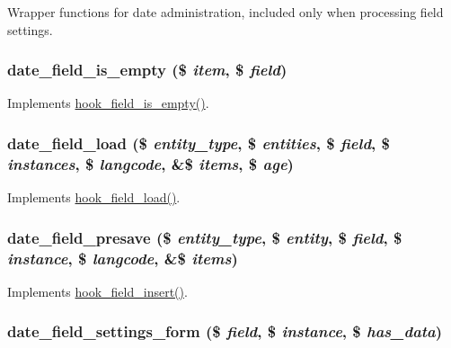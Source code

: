 Wrapper functions for date administration, included only when processing field settings. \hypertarget{date_8field_8inc_aedcb2a64f24594d3c65037e9eb2346e2}{
\subsubsection[{date\_\-field\_\-is\_\-empty}]{\setlength{\rightskip}{0pt plus 5cm}date\_\-field\_\-is\_\-empty (\$ {\em item}, \/  \$ {\em field})}}
\label{date_8field_8inc_aedcb2a64f24594d3c65037e9eb2346e2}
Implements \hyperlink{group__field__types_ga192dd7e7a02a7bc9e0af8b67b187b071}{hook\_\-field\_\-is\_\-empty()}. \hypertarget{date_8field_8inc_a0d7b24400d26db6ee3792d916b76be54}{
\subsubsection[{date\_\-field\_\-load}]{\setlength{\rightskip}{0pt plus 5cm}date\_\-field\_\-load (\$ {\em entity\_\-type}, \/  \$ {\em entities}, \/  \$ {\em field}, \/  \$ {\em instances}, \/  \$ {\em langcode}, \/  \&\$ {\em items}, \/  \$ {\em age})}}
\label{date_8field_8inc_a0d7b24400d26db6ee3792d916b76be54}
Implements \hyperlink{group__field__types_ga37f2456e9b5b8b39dc11cffd59163c19}{hook\_\-field\_\-load()}. \hypertarget{date_8field_8inc_ac5f5698a39e9851297e225104340f307}{
\subsubsection[{date\_\-field\_\-presave}]{\setlength{\rightskip}{0pt plus 5cm}date\_\-field\_\-presave (\$ {\em entity\_\-type}, \/  \$ {\em entity}, \/  \$ {\em field}, \/  \$ {\em instance}, \/  \$ {\em langcode}, \/  \&\$ {\em items})}}
\label{date_8field_8inc_ac5f5698a39e9851297e225104340f307}
Implements \hyperlink{group__field__types_ga2d29ec2e4a47170d5aaaf41bdd4813df}{hook\_\-field\_\-insert()}. \hypertarget{date_8field_8inc_a5f070593dfcf73a90c953b2402e0739b}{
\subsubsection[{date\_\-field\_\-settings\_\-form}]{\setlength{\rightskip}{0pt plus 5cm}date\_\-field\_\-settings\_\-form (\$ {\em field}, \/  \$ {\em instance}, \/  \$ {\em has\_\-data})}}
